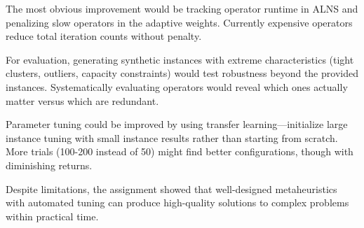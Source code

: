 \documentclass[a4paper]{scrartcl}
\begin{document}
The most obvious improvement would be tracking operator runtime in ALNS and penalizing slow operators in the adaptive weights.
Currently expensive operators reduce total iteration counts without penalty.

For evaluation, generating synthetic instances with extreme characteristics (tight clusters, outliers, capacity constraints) would test robustness beyond the provided instances.
Systematically evaluating operators would reveal which ones actually matter versus which are redundant.

Parameter tuning could be improved by using transfer learning—initialize large instance tuning with small instance results rather than starting from scratch.
More trials (100-200 instead of 50) might find better configurations, though with diminishing returns.

Despite limitations, the assignment showed that well-designed metaheuristics with automated tuning can produce high-quality solutions to complex problems within practical time.
\end{document}
